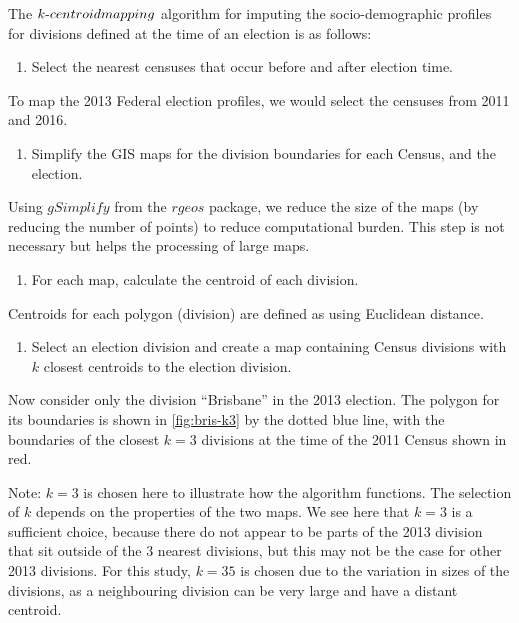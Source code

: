 \documentclass{monashthesis}
\theoremstyle{definition}
\theoremstyle{definition}
\theoremstyle{definition}
\theoremstyle{remark}
\begin{document}
The \(k{\text -}centroid \space mapping\) algorithm for imputing the
socio-demographic profiles for divisions defined at the time of an
election is as follows:

\begin{enumerate}
\def\labelenumi{\arabic{enumi}.}
\tightlist
\item
  Select the nearest censuses that occur before and after election time.
\end{enumerate}

To map the 2013 Federal election profiles, we would select the censuses
from 2011 and 2016.

\begin{enumerate}
\def\labelenumi{\arabic{enumi}.}
\setcounter{enumi}{1}
\tightlist
\item
  Simplify the GIS maps for the division boundaries for each Census, and
  the election.
\end{enumerate}

Using \(gSimplify\) from the \(rgeos\) package, we reduce the size of
the maps (by reducing the number of points) to reduce computational
burden. This step is not necessary but helps the processing of large
maps.

\begin{enumerate}
\def\labelenumi{\arabic{enumi}.}
\setcounter{enumi}{2}
\tightlist
\item
  For each map, calculate the centroid of each division.
\end{enumerate}

Centroids for each polygon (division) are defined as using Euclidean
distance.

\begin{enumerate}
\def\labelenumi{\arabic{enumi}.}
\setcounter{enumi}{3}
\tightlist
\item
  Select an election division and create a map containing Census
  divisions with \(k\) closest centroids to the election division.
\end{enumerate}

Now consider only the division ``Brisbane'' in the 2013 election. The
polygon for its boundaries is shown in \ref{fig:bris-k3} by the dotted
blue line, with the boundaries of the closest \(k = 3\) divisions at the
time of the 2011 Census shown in red.

Note: \(k = 3\) is chosen here to illustrate how the algorithm
functions. The selection of \(k\) depends on the properties of the two
maps. We see here that \(k = 3\) is a sufficient choice, because there
do not appear to be parts of the 2013 division that sit outside of the 3
nearest divisions, but this may not be the case for other 2013
divisions. For this study, \(k=35\) is chosen due to the variation in
sizes of the divisions, as a neighbouring division can be very large and
have a distant centroid.
\end{document}
